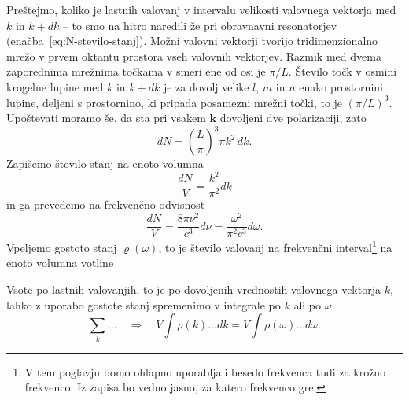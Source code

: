 Preštejmo, koliko je lastnih valovanj v intervalu velikosti valovnega
vektorja med $k$ in $k+dk$ -- to smo na hitro naredili že pri obravnavni
resonatorjev (enačba~\ref{eq:N-stevilo-stanj}). Možni valovni vektorji tvorijo tridimenzionalno
mrežo v prvem oktantu prostora vseh valovnih vektorjev. Razmik med
dvema zaporednima mrežnima točkama v smeri ene od osi je $\pi/L$.
Število točk v osmini krogelne lupine med $k$ in $k+dk$ je za dovolj
velike $l$, $m$ in $n$ enako prostornini lupine, deljeni
s prostornino, ki pripada posamezni mrežni točki, to je $(\pi/L)^{3}$.
Upoštevati moramo še, da sta pri vsakem $\mathbf{k}$ dovoljeni dve polarizaciji, zato
\begin{equation}
dN=\left(\frac{L}{\pi}\right)^{3}\pi k^{2}\, dk.
\label{4.2}
\end{equation}
Zapišemo število stanj na enoto volumna
\begin{equation}
\frac{dN}{V}=\frac{ k^{2}}{\pi^{2}} dk
\label{4.3}
\end{equation}
in ga prevedemo na frekvenčno odvisnost
\begin{equation}
\frac{dN}{V}=\frac{8 \pi \nu^{2} }{c^{3}}d\nu = \frac{\omega^2}{\pi^2c^3}d\omega.
\end{equation}
Vpeljemo gostoto stanj  $\varrho (\omega)$, to je število valovanj na 
frekvenčni interval\footnote{V tem poglavju bomo ohlapno uporabljali besedo
frekvenca tudi za krožno frekvenco. Iz zapisa bo vedno jasno, za katero frekvenco gre.}
na enoto volumna votline

Vsote po lastnih valovanjih, to je po dovoljenih vrednostih valovnega vektorja $k$,
lahko z uporabo gostote stanj spremenimo v integrale po $k$ ali po $\omega$
\begin{equation}
\sum_{k}\ldots \quad \Rightarrow \quad V\int\rho(k)\ldots dk=V\int\rho(\omega)\ldots d\omega.
\label{4.5}
\end{equation}

